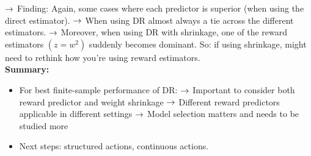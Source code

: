 $\rightarrow$ Finding: Again, some cases where each predictor is superior (when using the direct estimator).
$\rightarrow$ When using DR almost always a tie across the different estimators.
$\rightarrow$ Moreover, when using DR with shrinkage, one of the reward estimators $(z=w^2)$ suddenly becomes dominant. So: if using shrinkage, might need to rethink how you're using reward estimators. \\

{\bf Summary:}
\begin{itemize}
    \item For best finite-sample performance of DR:
    $\rightarrow$ Important to consider both reward predictor and weight shrinkage
    $\rightarrow$ Different reward predictors applicable in different settings
    $\rightarrow$ Model selection matters and needs to be studied more
    \item Next steps: structured actions, continuous actions.
\end{itemize}


\spacerule


